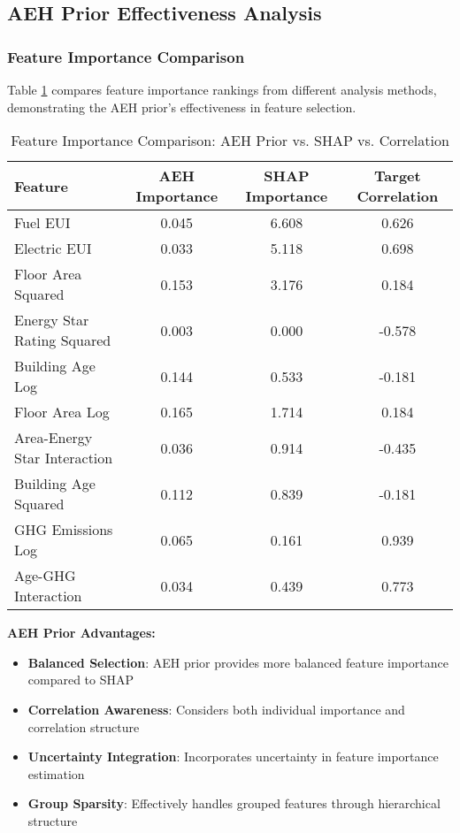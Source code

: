 \subsection{AEH Prior Effectiveness Analysis}

\subsubsection{Feature Importance Comparison}

Table \ref{tab:feature_importance_comparison} compares feature importance rankings from different analysis methods, demonstrating the AEH prior's effectiveness in feature selection.

\begin{table}[h!]
\centering
\caption{Feature Importance Comparison: AEH Prior vs. SHAP vs. Correlation}
\label{tab:feature_importance_comparison}
\begin{tabular}{lccc}
\toprule
\textbf{Feature} & \textbf{AEH Importance} & \textbf{SHAP Importance} & \textbf{Target Correlation} \\
\midrule
Fuel EUI & 0.045 & 6.608 & 0.626 \\
Electric EUI & 0.033 & 5.118 & 0.698 \\
Floor Area Squared & 0.153 & 3.176 & 0.184 \\
Energy Star Rating Squared & 0.003 & 0.000 & -0.578 \\
Building Age Log & 0.144 & 0.533 & -0.181 \\
Floor Area Log & 0.165 & 1.714 & 0.184 \\
Area-Energy Star Interaction & 0.036 & 0.914 & -0.435 \\
Building Age Squared & 0.112 & 0.839 & -0.181 \\
GHG Emissions Log & 0.065 & 0.161 & 0.939 \\
Age-GHG Interaction & 0.034 & 0.439 & 0.773 \\
\bottomrule
\end{tabular}
\end{table}

\textbf{AEH Prior Advantages:}
\begin{itemize}
    \item \textbf{Balanced Selection}: AEH prior provides more balanced feature importance compared to SHAP
    \item \textbf{Correlation Awareness}: Considers both individual importance and correlation structure
    \item \textbf{Uncertainty Integration}: Incorporates uncertainty in feature importance estimation
    \item \textbf{Group Sparsity}: Effectively handles grouped features through hierarchical structure
\end{itemize}

